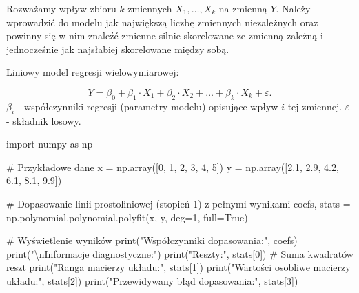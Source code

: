 \documentclass[
  polish,
  letterpaper,
  DIV=11,
  numbers=noendperiod]{scrreprt}
\newenvironment{Shaded}{\begin{snugshade}}{\end{snugshade}}
\newcommand{\BuiltInTok}[1]{\textcolor[rgb]{0.00,0.23,0.31}{#1}}
\newcommand{\CharTok}[1]{\textcolor[rgb]{0.13,0.47,0.30}{#1}}
\newcommand{\CommentTok}[1]{\textcolor[rgb]{0.37,0.37,0.37}{#1}}
\newcommand{\DecValTok}[1]{\textcolor[rgb]{0.68,0.00,0.00}{#1}}
\newcommand{\FloatTok}[1]{\textcolor[rgb]{0.68,0.00,0.00}{#1}}
\newcommand{\ImportTok}[1]{\textcolor[rgb]{0.00,0.46,0.62}{#1}}
\newcommand{\NormalTok}[1]{\textcolor[rgb]{0.00,0.23,0.31}{#1}}
\newcommand{\OperatorTok}[1]{\textcolor[rgb]{0.37,0.37,0.37}{#1}}
\newcommand{\StringTok}[1]{\textcolor[rgb]{0.13,0.47,0.30}{#1}}
\newcommand{\VariableTok}[1]{\textcolor[rgb]{0.07,0.07,0.07}{#1}}
\begin{document}
Rozważamy wpływ zbioru \(k\) zmiennych \(X_1, \ldots, X_k\) na zmienną
\(Y\). Należy wprowadzić do modelu jak największą liczbę zmiennych
niezależnych oraz powinny się w nim znaleźć zmienne silnie skorelowane
ze zmienną zależną i jednocześnie jak najsłabiej skorelowane między
sobą.

Liniowy model regresji wielowymiarowej:

\[Y=\beta_0 +\beta_1\cdot X_1+\beta_2\cdot X_2+\ldots+\beta_k\cdot X_k+\varepsilon.\]
\(\beta_i\) - współczynniki regresji (parametry modelu) opisujące wpływ
\(i\)-tej zmiennej. \(\varepsilon\) - składnik losowy.

\begin{Shaded}
\begin{Highlighting}[]
\ImportTok{import}\NormalTok{ numpy }\ImportTok{as}\NormalTok{ np}

\CommentTok{\# Przykładowe dane}
\NormalTok{x }\OperatorTok{=}\NormalTok{ np.array([}\DecValTok{0}\NormalTok{, }\DecValTok{1}\NormalTok{, }\DecValTok{2}\NormalTok{, }\DecValTok{3}\NormalTok{, }\DecValTok{4}\NormalTok{, }\DecValTok{5}\NormalTok{])}
\NormalTok{y }\OperatorTok{=}\NormalTok{ np.array([}\FloatTok{2.1}\NormalTok{, }\FloatTok{2.9}\NormalTok{, }\FloatTok{4.2}\NormalTok{, }\FloatTok{6.1}\NormalTok{, }\FloatTok{8.1}\NormalTok{, }\FloatTok{9.9}\NormalTok{])}

\CommentTok{\# Dopasowanie linii prostoliniowej (stopień 1) z pełnymi wynikami}
\NormalTok{coefs, stats }\OperatorTok{=}\NormalTok{ np.polynomial.polynomial.polyfit(x, y, deg}\OperatorTok{=}\DecValTok{1}\NormalTok{, full}\OperatorTok{=}\VariableTok{True}\NormalTok{)}

\CommentTok{\# Wyświetlenie wyników}
\BuiltInTok{print}\NormalTok{(}\StringTok{"Współczynniki dopasowania:"}\NormalTok{, coefs)}
\BuiltInTok{print}\NormalTok{(}\StringTok{"}\CharTok{\textbackslash{}n}\StringTok{Informacje diagnostyczne:"}\NormalTok{)}
\BuiltInTok{print}\NormalTok{(}\StringTok{"Reszty:"}\NormalTok{, stats[}\DecValTok{0}\NormalTok{])  }\CommentTok{\# Suma kwadratów reszt}
\BuiltInTok{print}\NormalTok{(}\StringTok{"Ranga macierzy układu:"}\NormalTok{, stats[}\DecValTok{1}\NormalTok{])}
\BuiltInTok{print}\NormalTok{(}\StringTok{"Wartości osobliwe macierzy układu:"}\NormalTok{, stats[}\DecValTok{2}\NormalTok{])}
\BuiltInTok{print}\NormalTok{(}\StringTok{"Przewidywany błąd dopasowania:"}\NormalTok{, stats[}\DecValTok{3}\NormalTok{])}
\end{Highlighting}
\end{Shaded}
\end{document}
